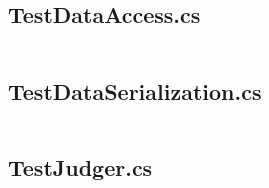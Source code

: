 \documentclass[a4paper]{report}
\begin{document}
\inputminted{csharp}{"../src/Algorithm Dynamics.Test/DatabaseHelper.cs"}

\subsection{TestDataAccess.cs}

\inputminted{csharp}{"../src/Algorithm Dynamics.Test/TestDataAccess.cs"}

\subsection{TestDataSerialization.cs}

\inputminted{csharp}{"../src/Algorithm Dynamics.Test/TestDataSerialization.cs"}

\subsection{TestJudger.cs}

\inputminted{csharp}{"../src/Algorithm Dynamics.Test/TestJudger.cs"}

\setcounter{biburlnumpenalty}{9000}
\setcounter{biburllcpenalty}{9000}
\setcounter{biburlucpenalty}{9000}

\printbibliography[
    heading=bibintoc,
    title={Bibliography}
]
\end{document}
